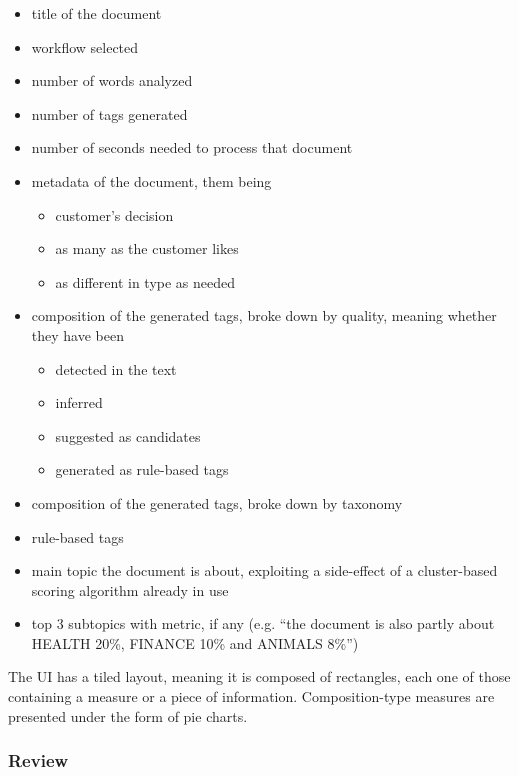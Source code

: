 \documentclass[12pt,svgnames]{memoir}
\begin{document}
\begin{itemize}
\itemsep1pt\parskip0pt
\item
  title of the document
\item
  workflow selected
\item
  number of words analyzed
\item
  number of tags generated
\item
  number of seconds needed to process that document
\item
  metadata of the document, them being

  \begin{itemize}
  \itemsep1pt\parskip0pt
  \item
    customer's decision
  \item
    as many as the customer likes
  \item
    as different in type as needed
  \end{itemize}
\item
  composition of the generated tags, broke down by quality, meaning
  whether they have been

  \begin{itemize}
  \itemsep1pt\parskip0pt
  \item
    detected in the text
  \item
    inferred
  \item
    suggested as candidates
  \item
    generated as rule-based tags
  \end{itemize}
\item
  composition of the generated tags, broke down by taxonomy
\item
  rule-based tags
\item
  main topic the document is about, exploiting a side-effect of a
  cluster-based scoring algorithm already in use
\item
  top 3 subtopics with metric, if any (e.g. ``the document is also
  partly about HEALTH 20\%, FINANCE 10\% and ANIMALS 8\%'')
\end{itemize}

The UI has a tiled layout, meaning it is composed of rectangles, each
one of those containing a measure or a piece of information.
Composition-type measures are presented under the form of pie charts.

\subsubsection*{Review}\label{review}
\end{document}
